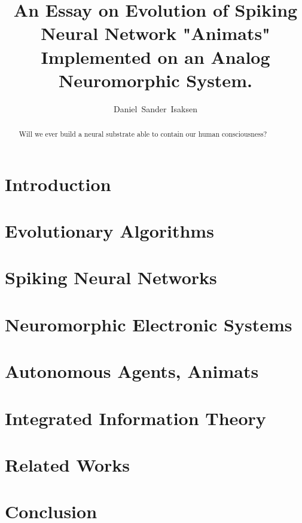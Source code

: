 \documentclass[UKenglish]{ifimaster}
\title{An Essay on Evolution of Spiking Neural Network "Animats" Implemented on an Analog Neuromorphic System.}
\author{Daniel~Sander~Isaksen}%
\begin{document}
\maketitle

\begin{abstract}
Will we ever build a neural substrate able to contain our human consciousness?
\end{abstract}

\tableofcontents{}

\section{Introduction}\label{sect:intro}


\section{Evolutionary Algorithms}\label{sect:ea}


\section{Spiking Neural Networks}\label{sect:snn}


\section{Neuromorphic Electronic Systems}\label{sect:neuromorphic}


\section{Autonomous Agents, Animats}\label{sect:agent}


\section{Integrated Information Theory}\label{sect:iit}


\section{Related Works}


\section{Conclusion}


\printbibliography
\end{document}
